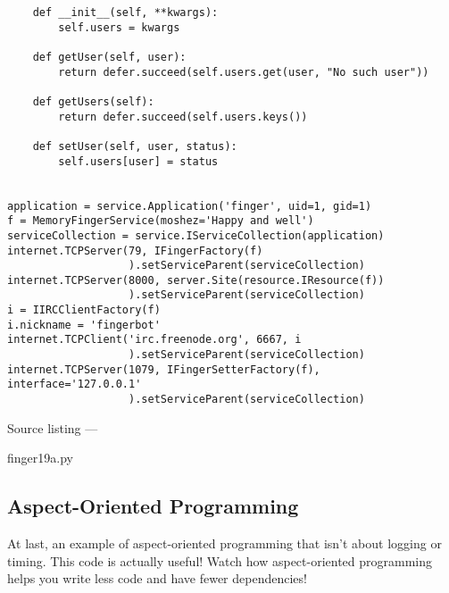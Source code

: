 \begin{verbatim}
    def __init__(self, **kwargs):
        self.users = kwargs

    def getUser(self, user):
        return defer.succeed(self.users.get(user, "No such user"))

    def getUsers(self):
        return defer.succeed(self.users.keys())

    def setUser(self, user, status):
        self.users[user] = status


application = service.Application('finger', uid=1, gid=1)
f = MemoryFingerService(moshez='Happy and well')
serviceCollection = service.IServiceCollection(application)
internet.TCPServer(79, IFingerFactory(f)
                   ).setServiceParent(serviceCollection)
internet.TCPServer(8000, server.Site(resource.IResource(f))
                   ).setServiceParent(serviceCollection)
i = IIRCClientFactory(f)
i.nickname = 'fingerbot'
internet.TCPClient('irc.freenode.org', 6667, i
                   ).setServiceParent(serviceCollection)
internet.TCPServer(1079, IFingerSetterFactory(f), interface='127.0.0.1'
                   ).setServiceParent(serviceCollection)
\end{verbatim}\parbox[b]{\linewidth}{\begin{center}Source listing --- \begin{em}finger19a.py\end{em}\end{center}}

\subsection{Aspect-Oriented Programming}


At last, an example of aspect-oriented programming that isn't about logging or timing. This code is actually useful! Watch how aspect-oriented programming helps you write less code and have fewer dependencies! 
